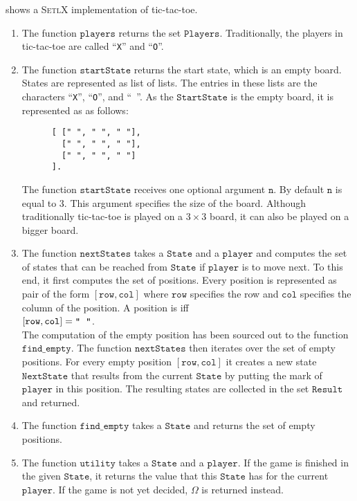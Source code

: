  shows a \textsc{SetlX} implementation of tic-tac-toe.
\begin{enumerate}
\item The function $\mathtt{players}$ returns the set $\mathtt{Players}$.  Traditionally, the players in
      tic-tac-toe are called ``\texttt{X}'' and ``\texttt{O}''.
\item The function $\mathtt{startState}$ returns the start state, which is an empty board.
      States are represented as list of lists.  The entries in these lists are the characters 
      ``\texttt{X}'', ``\texttt{O}'', and ``\texttt{ }''.
      As the  $\mathtt{StartState}$ is the empty board, it is represented as as follows:
      \begin{Verbatim}
      [ [" ", " ", " "], 
        [" ", " ", " "], 
        [" ", " ", " "]
      ].     
      \end{Verbatim}
      The function $\mathtt{startState}$ receives one optional argument $\mathtt{n}$.
      By default $\mathtt{n}$ is equal to $3$.  This argument specifies the size of the board.
      Although traditionally tic-tac-toe is played on a $3 \times 3$ board, it can also 
      be played on a bigger board.
\item The function $\mathtt{nextStates}$ takes a $\mathtt{State}$ and a $\mathtt{player}$ and computes the set
      of states that can be reached from $\mathtt{State}$ if $\mathtt{player}$ is to move next.
      To this end, it first computes the set of  positions.  Every position is represented as pair of the
      form $[\mathtt{row}, \mathtt{col}]$ where $\mathtt{row}$ specifies the row and $\mathtt{col}$ specifies
      the column of the position.  A position is  iff
      \\[0.2cm]
      \hspace*{1.3cm}
      $[\mathtt{row}, \mathtt{col}] = \texttt{\symbol{34}\;\;\symbol{34}}$.
      \\[0.2cm]
      The computation of the empty position has been sourced out to the function $\mathtt{find\_empty}$.
      The function $\mathtt{nextStates}$ then iterates over the set of empty positions. For every 
      empty position $[\mathtt{row}, \mathtt{col}]$ it creates a new state $\mathtt{NextState}$ that results
      from the current $\mathtt{State}$ by putting the mark of $\mathtt{player}$ in this position.  
      The resulting states are collected in the set $\mathtt{Result}$ and returned.
\item The function $\mathtt{find\_empty}$ takes a $\mathtt{State}$ and returns the set of empty positions.
\item The function $\mathtt{utility}$ takes a $\mathtt{State}$ and a $\mathtt{player}$.  If the game is 
      finished in the given $\mathtt{State}$, it returns the value that this $\mathtt{State}$ has for the
      current $\mathtt{player}$.  If the game is not yet decided, $\Omega$ is returned instead.
 

\end{enumerate}
